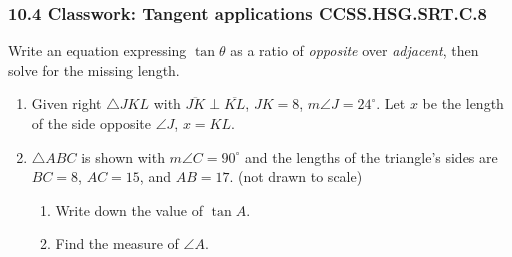 \documentclass[12pt, twoside]{article}
\begin{document}
\subsubsection*{10.4 Classwork: Tangent applications \hfill CCSS.HSG.SRT.C.8}
Write an equation expressing $\tan \theta$ as a ratio of \emph{opposite} over \emph{adjacent}, then solve for the missing length.
\begin{enumerate}
\item Given right $\triangle JKL$ with $\overline{JK} \perp \overline{KL}$, $JK=8$, $m\angle J=24^\circ$. Let $x$ be the length of the side opposite $\angle J$, $x=KL$.
    \begin{flushright}
      \end{flushright} \vspace{1.5cm}

\item $\triangle ABC$ is shown with $m\angle C=90^\circ$ and the lengths of the triangle's sides are $BC=8$, $AC=15$, and $AB=17$.  \hfill (not drawn to scale)
\begin{multicols}{2}
      \begin{enumerate}
      \item Write down the value of $\tan A$. \vspace{1.25cm}
      \item Find the measure of $\angle A$.  \vspace{1cm}
    \end{enumerate}
  \end{multicols} %


\end{enumerate}
\end{document}
